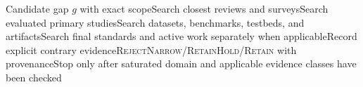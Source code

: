 \begin{algorithm}[H]\caption{Contrary-Evidence Gap Falsification Procedure}\label{proc:gap}\begin{algorithmic}[1]\Require Candidate gap $g$ with exact scope\State Search closest reviews and surveys\State Search evaluated primary studies\State Search datasets, benchmarks, testbeds, and artifacts\State Search final standards and active work separately when applicable\State Record explicit contrary evidence\State \Return \textsc{Reject}\State \Return \textsc{Narrow/Retain}\Else\State \Return \textsc{Hold/Retain} with provenance\EndIf\State Stop only after saturated domain and applicable evidence classes have been checked\end{algorithmic}\end{algorithm}